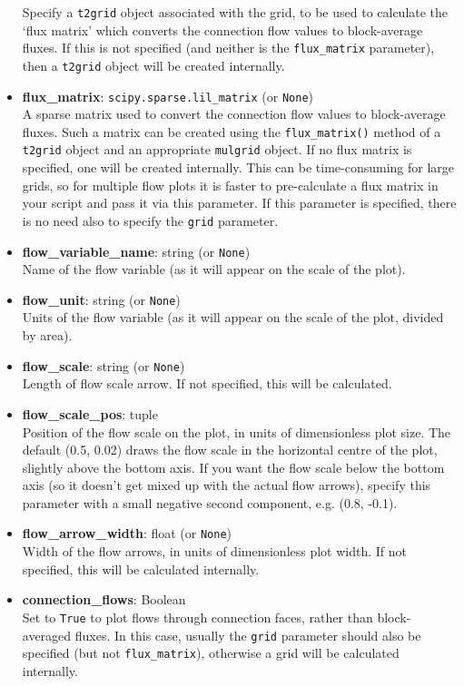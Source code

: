 \begin{itemize}
  Specify a \texttt{t2grid} object associated with the grid, to be used to calculate the `flux matrix' which converts the connection flow values to block-average fluxes.  If this is not specified (and neither is the \texttt{flux\_matrix} parameter), then a \texttt{t2grid} object will be created internally.
\item \textbf{flux\_matrix}: \texttt{scipy.sparse.lil\_matrix} (or \texttt{None})\\
  A sparse matrix used to convert the connection flow values to block-average fluxes.  Such a matrix can be created using the \texttt{flux\_matrix()} method of a \texttt{t2grid} object and an appropriate \texttt{mulgrid} object.  If no flux matrix is specified, one will be created internally.  This can be time-consuming for large grids, so for multiple flow plots it is faster to pre-calculate a flux matrix in your script and pass it via this parameter.  If this parameter is specified, there is no need also to specify the \texttt{grid} parameter.
\item \textbf{flow\_variable\_name}: string (or \texttt{None})\\
  Name of the flow variable (as it will appear on the scale of the plot).
\item \textbf{flow\_unit}: string (or \texttt{None})\\
  Units of the flow variable (as it will appear on the scale of the plot, divided by area).
\item \textbf{flow\_scale}: string (or \texttt{None})\\
  Length of flow scale arrow.  If not specified, this will be calculated.
\item \textbf{flow\_scale\_pos}: tuple\\
  Position of the flow scale on the plot, in units of dimensionless plot size.  The default (0.5, 0.02) draws the flow scale in the horizontal centre of the plot, slightly above the bottom axis.  If you want the flow scale below the bottom axis (so it doesn't get mixed up with the actual flow arrows), specify this parameter with a small negative second component, e.g. (0.8, -0.1).
\item \textbf{flow\_arrow\_width}: float (or \texttt{None})\\
  Width of the flow arrows, in units of dimensionless plot width.  If not specified, this will be calculated internally.
\item \textbf{connection\_flows}: Boolean\\
  Set to \texttt{True} to plot flows through connection faces, rather than block-averaged fluxes.  In this case, usually the \texttt{grid} parameter should also be specified (but not \texttt{flux\_matrix}), otherwise a grid will be calculated internally.
\end{itemize}

